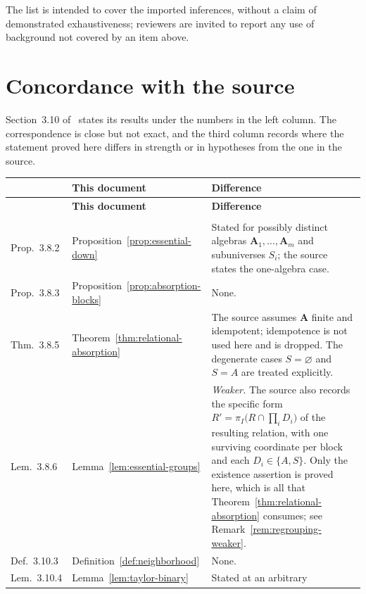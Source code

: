 \documentclass[11pt]{article}
\theoremstyle{mainplain}
\theoremstyle{mainroman}
\theoremstyle{definition}
\numberwithin{equation}{section}
\newcommand{\bA}{\mathbf A}
\begin{document}
The list is intended to cover the imported inferences, without a claim of
demonstrated exhaustiveness; reviewers are invited to report any use of
background not covered by an item above.

\section{Concordance with the source}\label{app:concordance}

Section~3.10 of~\cite{BradyNotes} states its results under the numbers in the
left column. The correspondence is close but not exact, and the third column
records where the statement proved here differs in strength or in hypotheses
from the one in the source.

\renewcommand{\arraystretch}{1.12}
\begin{longtable}{@{}>{\raggedright\arraybackslash}p{}>{\raggedright\arraybackslash}p{}>{\raggedright\arraybackslash}p{}@{}}
\hline
\textbf{\cite{BradyNotes}} & \textbf{This document} & \textbf{Difference}\\
\hline
\endfirsthead
\hline
\textbf{\cite{BradyNotes}} & \textbf{This document} & \textbf{Difference}\\
\hline
\endhead
\hline
\multicolumn{3}{r}{\small Continued on next page}\\
\endfoot
\hline
\endlastfoot
Prop.\ 3.8.2 & Proposition~\ref{prop:essential-down} & Stated for possibly
distinct algebras $\bA_1,\dots,\bA_m$ and subuniverses $S_i$; the source states
the one-algebra case.\\
Prop.\ 3.8.3 & Proposition~\ref{prop:absorption-blocks} & None.\\
Thm.\ 3.8.5 & Theorem~\ref{thm:relational-absorption} & The source assumes
$\bA$ finite and idempotent; idempotence is not used here and is dropped. The
degenerate cases $S=\varnothing$ and $S=A$ are treated explicitly.\\
Lem.\ 3.8.6 & Lemma~\ref{lem:essential-groups} & \emph{Weaker.} The source also
records the specific form $R'=\pi_I\bigl(R\cap\prod_i D_i\bigr)$ of the
resulting relation, with one surviving coordinate per block and each
$D_i\in\{A,S\}$.
Only the existence assertion is proved here, which is all that
Theorem~\ref{thm:relational-absorption} consumes; see
Remark~\ref{rem:regrouping-weaker}.\\
Def.\ 3.10.3 & Definition~\ref{def:neighborhood} & None.\\
Lem.\ 3.10.4 & Lemma~\ref{lem:taylor-binary} & Stated at an arbitrary

\end{longtable}
\end{document}
